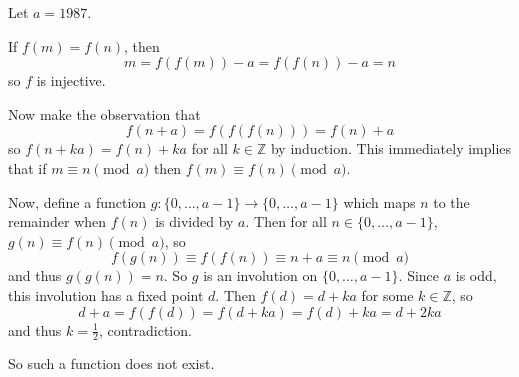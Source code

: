 Let $a=1987$.

If $f(m)=f(n)$, then \[m=f(f(m))-a=f(f(n))-a=n\] so $f$ is injective.

Now make the observation that \[f(n+a)=f(f(f(n)))=f(n)+a\] so $f(n+ka)=f(n)+ka$ for all $k\in\mathbb{Z}$ by induction. This immediately implies that if $m\equiv n\pmod a$ then $f(m)\equiv f(n)\pmod a$.

Now, define a function $g:\{0,\ldots,a-1\}\to\{0,\ldots,a-1\}$ which maps $n$ to the remainder when $f(n)$ is divided by $a$. Then for all $n\in\{0,\ldots,a-1\}$, $g(n)\equiv f(n)\pmod a$, so \[f(g(n))\equiv f(f(n))\equiv n+a\equiv n\pmod a\] and thus $g(g(n))=n$. So $g$ is an involution on $\{0,\ldots,a-1\}$. Since $a$ is odd, this involution has a fixed point $d$. Then $f(d)=d+ka$ for some $k\in\mathbb{Z}$, so \[d+a=f(f(d))=f(d+ka)=f(d)+ka=d+2ka\] and thus $k=\frac{1}{2}$, contradiction.

So such a function does not exist.